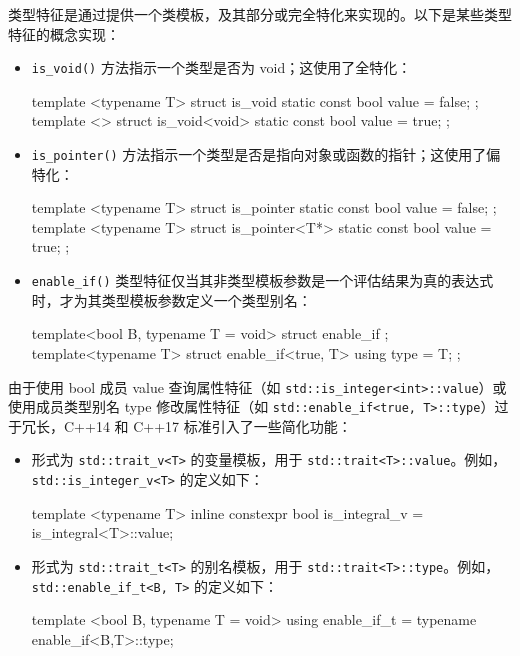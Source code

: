 类型特征是通过提供一个类模板，及其部分或完全特化来实现的。以下是某些类型特征的概念实现：

\begin{itemize}
\item
\verb|is_void()| 方法指示一个类型是否为 void；这使用了全特化：

\begin{cpp}
template <typename T>
struct is_void
{ static const bool value = false; };
template <>
struct is_void<void>
{ static const bool value = true; };
\end{cpp}

\item
\verb|is_pointer()| 方法指示一个类型是否是指向对象或函数的指针；这使用了偏特化：

\begin{cpp}
template <typename T>
struct is_pointer
{ static const bool value = false; };
template <typename T>
struct is_pointer<T*>
{ static const bool value = true; };
\end{cpp}

\item
\verb|enable_if()| 类型特征仅当其非类型模板参数是一个评估结果为真的表达式时，才为其类型模板参数定义一个类型别名：

\begin{cpp}
template<bool B, typename T = void>
struct enable_if {};
template<typename T>
struct enable_if<true, T> { using type = T; };
\end{cpp}
\end{itemize}

由于使用 bool 成员 value 查询属性特征（如 \verb|std::is_integer<int>::value|）或使用成员类型别名 type 修改属性特征（如 \verb|std::enable_if<true, T>::type|）过于冗长，C++14 和 C++17 标准引入了一些简化功能：

\begin{itemize}
\item
形式为 \verb|std::trait_v<T>| 的变量模板，用于 \verb|std::trait<T>::value|。例如，\verb|std::is_integer_v<T>| 的定义如下：

\begin{cpp}
template <typename T>
inline constexpr bool is_integral_v = is_integral<T>::value;
\end{cpp}

\item
形式为 \verb|std::trait_t<T>| 的别名模板，用于 \verb|std::trait<T>::type|。例如，\verb|std::enable_if_t<B, T>| 的定义如下：

\begin{cpp}
template <bool B, typename T = void>
using enable_if_t = typename enable_if<B,T>::type;
\end{cpp}
\end{itemize}


